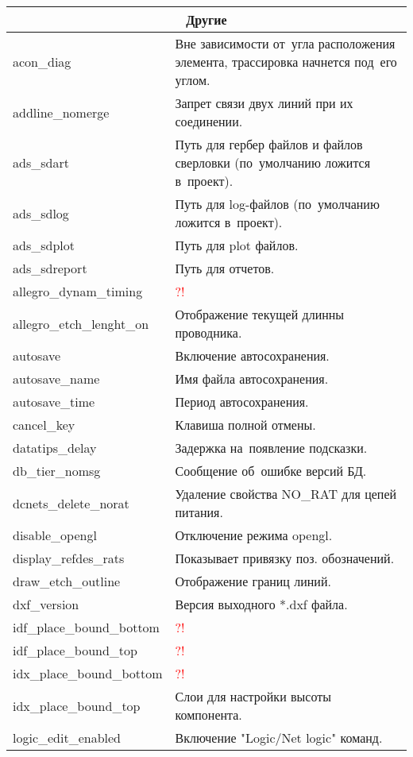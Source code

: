 \begin{tabularx}{\linewidth}{| m{6.5cm} | X |}
	\multicolumn{2}{|c|}{Другие}									\\ \hline
	acon\_diag 				& Вне зависимости от~угла расположения элемента, трассировка начнется под~его углом. \\ \hline
	addline\_nomerge 		& Запрет связи двух линий при их соединении.	\\ \hline
	ads\_sdart 				& Путь для гербер файлов и файлов сверловки (по~умолчанию ложится в~проект). \\ \hline
	ads\_sdlog 				& Путь для log-файлов (по~умолчанию ложится в~проект). \\ \hline
	ads\_sdplot 			& Путь для plot файлов.					\\ \hline
	ads\_sdreport 			& Путь для отчетов.						\\ \hline
	allegro\_dynam\_timing	& \textcolor{red}{?!} 					\\ \hline
	allegro\_etch\_lenght\_on& Отображение текущей длинны проводника.\\ \hline
	autosave 				& Включение автосохранения.				\\ \hline
	autosave\_name			& Имя файла автосохранения.				\\ \hline
	autosave\_time			& Период автосохранения.				\\ \hline
	cancel\_key				& Клавиша полной отмены.				\\ \hline
	datatips\_delay 		& Задержка на~появление подсказки.		\\ \hline
	db\_tier\_nomsg 		& Сообщение об~ошибке версий БД.		\\ \hline
	dcnets\_delete\_norat	& Удаление свойства NO\_RAT для цепей питания.	\\ \hline
	disable\_opengl			& Отключение режима opengl.				\\ \hline
	display\_refdes\_rats	& Показывает привязку поз. обозначений.	\\ \hline
	draw\_etch\_outline		& Отображение границ линий.				\\ \hline
	dxf\_version			& Версия выходного *.dxf файла.			\\ \hline
	idf\_place\_bound\_bottom & \textcolor{red}{?!} 					\\ \hline
	idf\_place\_bound\_top	& \textcolor{red}{?!} 					\\ \hline
	idx\_place\_bound\_bottom & \textcolor{red}{?!} 				\\ \hline
	idx\_place\_bound\_top	& Слои для настройки высоты компонента.	\\ \hline
	logic\_edit\_enabled 	& Включение "Logic/Net logic" команд.	\\ \hline 

\end{tabularx}
